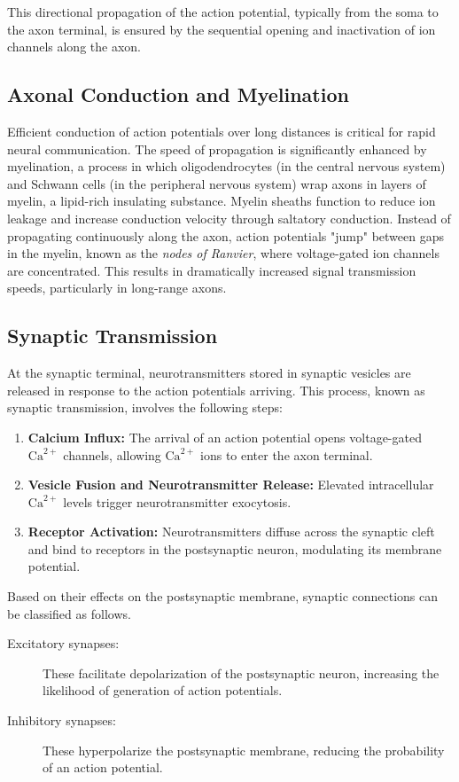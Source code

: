 This directional propagation of the action potential, typically from the soma to the axon terminal, is ensured
by the sequential opening and inactivation of ion channels along the axon.

\subsection{Axonal Conduction and Myelination}
\label{subsec:axonal_conduction}
Efficient conduction of action potentials over long distances is critical for
rapid neural communication. The speed of propagation is significantly enhanced by
myelination, a process in which oligodendrocytes (in the central nervous system) 
and Schwann cells (in the peripheral nervous system) wrap axons in layers of myelin, 
a lipid-rich insulating substance. Myelin sheaths function to reduce ion leakage and
increase conduction velocity through saltatory conduction. Instead of propagating
continuously along the axon, action potentials "jump" between gaps in the myelin, 
known as the \emph{nodes of Ranvier}, where voltage-gated ion channels are concentrated. 
This results in dramatically increased signal transmission speeds, particularly
in long-range axons.

\subsection{Synaptic Transmission}
\label{subsec:synaptic_transmission}
At the synaptic terminal, neurotransmitters stored in synaptic vesicles are released
in response to the action potentials arriving. This process, known as synaptic transmission,
involves the following steps:

\begin{enumerate}
    \item \textbf{Calcium Influx:} The arrival of an action potential opens voltage-gated 
    $\text{Ca}^{2+}$ channels, allowing $\text{Ca}^{2+}$ ions to enter the axon terminal.
    \item \textbf{Vesicle Fusion and Neurotransmitter Release:} Elevated intracellular $\text{Ca}^{2+}$ levels trigger neurotransmitter exocytosis.
    \item \textbf{Receptor Activation:} Neurotransmitters diffuse across the synaptic cleft and bind to receptors in the postsynaptic neuron, modulating its membrane potential. 
\end{enumerate}

Based on their effects on the postsynaptic membrane, synaptic connections can be classified as follows.
\begin{description}
    \item[Excitatory synapses:] These facilitate depolarization of the postsynaptic neuron, increasing the likelihood of generation of action potentials.
    \item[Inhibitory synapses:] These hyperpolarize the postsynaptic membrane, reducing the probability of an action potential.
\end{description}

